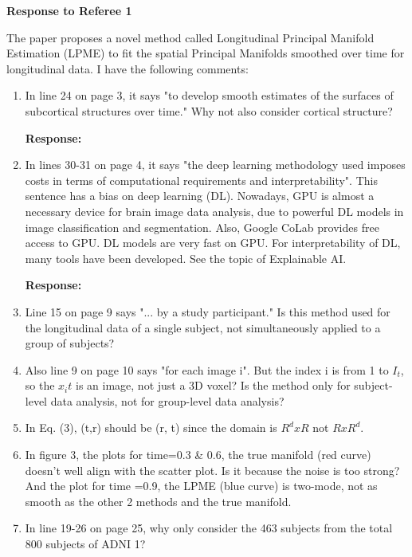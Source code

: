 \documentclass{article}
\theoremstyle{definition}
\begin{document}
\large{\textbf{Response to Referee 1}}

\vspace{0.25in}

The paper proposes a novel method called Longitudinal Principal Manifold Estimation (LPME) to fit the spatial Principal Manifolds smoothed over time for longitudinal data. I have the following comments:

\begin{enumerate}
\item In line 24 on page 3, it says "to develop smooth estimates of the surfaces of subcortical structures over time." Why not also consider cortical structure?

{\bf Response:}

\item In lines 30-31 on page 4, it says "the deep learning methodology used imposes costs in terms of computational requirements and interpretability". This sentence has a bias on deep learning (DL). Nowadays, GPU is almost a necessary device for brain image data analysis, due to powerful DL models in image classification and segmentation. Also, Google CoLab provides free access to GPU. DL models are very fast on GPU. For interpretability of DL, many tools have been developed. See the topic of Explainable AI.

{\bf Response:}

\item Line 15 on page 9 says "... by a study participant." Is this method used for the longitudinal data of a single subject, not simultaneously applied to a group of subjects?

\item Also line 9 on page 10 says "for each image i". But the index i is from 1 to $I_t$, so the $x_it$ is an image, not just a 3D voxel? Is the method only for subject-level data analysis, not for group-level data analysis?

\item In Eq. (3), (t,r) should be (r, t) since the domain is $R^d x R$ not $R x R^d$.

\item In figure 3, the plots for time=0.3 \& 0.6, the true manifold (red curve) doesn’t well align with the scatter plot. Is it because the noise is too strong?
And the plot for time =0.9, the LPME (blue curve) is two-mode, not as smooth as the other 2 methods and the true manifold.

\item In line 19-26 on page 25, why only consider the 463 subjects from the total 800 subjects of ADNI 1?


\end{enumerate}
\end{document}
